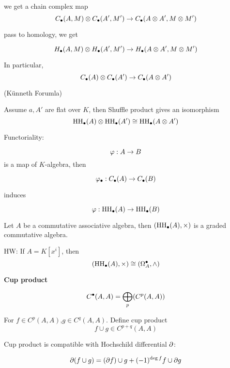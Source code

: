 

\begin{cor}
we get a chain complex map
$$C_{\bullet}(A,M)\otimes C_{\bullet}(A',M')
\to
C_{\bullet}(A\otimes A',M\otimes M')$$

pass to homology, we get

$$H_{\bullet}(A,M)\otimes H_{\bullet}(A',M')
\to
H_{\bullet}(A\otimes A',M\otimes M')$$

In particular,
$$C_{\bullet}(A)\otimes C_{\bullet}(A')\to C_{\bullet}(A\otimes A')$$
\end{cor}

\begin{thm}(K\"{u}nneth Forumla)

Assume $a,A'$ are flat over $K$,
then Shuffle product gives an isomorphism
$$\operatorname{HH}_{\bullet}(A)\otimes\operatorname{HH}_{\bullet}(A')\cong\operatorname{HH}_{\bullet}(A\otimes A')$$
\end{thm}


Functoriality:

$$\varphi:A\to B$$
is a map of $K$-algebra, then

$$\varphi_{\bullet}:C_{\bullet}(A)\to C_{\bullet}(B)$$

induces

$$\varphi:\operatorname{HH}_{\bullet}(A)\to \operatorname{HH}_{\bullet}(B)$$

\begin{cor}
Let $A$ be a commutative associative algebra, then
$(\operatorname{HH}_{\bullet}(A),\times)$ is a graded commutative algebra.
\end{cor}

HW: If $A=K[x^i]$, then
$$(\operatorname{HH}_{\bullet}(A),\times)\cong(\Omega_A^{\bullet},\wedge)$$

\textbf{Cup product}

$$C^{\bullet}(A,A)=\bigoplus_p(C^p(A,A))$$


\begin{definition}
For $f\in C^p(A,A)$,$g\in C^q(A,A)$. Define cup product
$$f\cup g\in C^{p+q}(A,A)$$
\end{definition}

\begin{prop}
Cup product is compatible with Hochschild differential $\partial$:

$$\partial(f\cup g)=(\partial f)\cup g+(-1)^{\deg f}f\cup\partial g$$
\end{prop}

